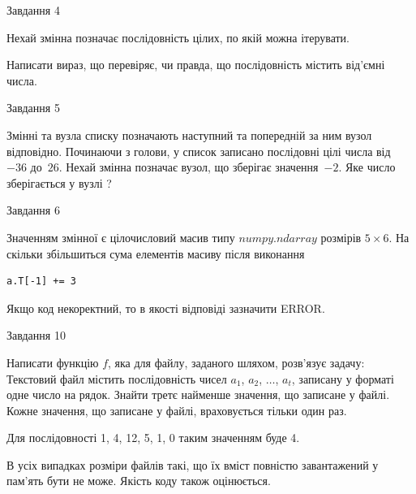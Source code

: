 \documentclass[12pt, ukrainian]{article}
\begin{document}
{               
{\begin{center}Завдання {4}\end{center}}
\vspace{-6mm}
Нехай змінна  позначає послідовність цілих, по якій можна ітерувати.

Написати вираз, що перевіряє, чи правда, що послідовність  містить від’ємні числа.\par

\vspace{10mm}
               
{\begin{center}Завдання {5}\end{center}}
\vspace{-6mm}
Змінні  та  вузла списку позначають наступний та попередній за ним вузол відповідно. Починаючи з голови, у список записано послідовні цілі числа від~$-36$ до~$26$. Нехай змінна  позначає вузол, що зберігає значення~$-2$.
Яке число зберігається у вузлі  ?\par

               
{\begin{center}Завдання {6}\end{center}}
\vspace{-6mm}
Значенням змінної  є цілочисловий масив типу $numpy.ndarray$ розмірів $5{\times}6$. На скільки збільшиться сума елементів масиву  після виконання
\begin{verbatim}
a.T[-1] += 3
\end{verbatim}


Якщо код некоректний, то в якості відповіді зазначити ERROR.\par

               
{\begin{center}Завдання {10}\end{center}}
\vspace{-6mm}

Написати функцію $f$, яка для файлу, заданого шляхом, розв’язує задачу:\\ Текстовий файл містить послідовність чисел $a_1$, $a_2$, $\ldots$, $a_t$, записану у форматі одне число на рядок. Знайти третє найменше значення, що записане у файлі. Кожне значення, що записане у файлі, враховується тільки один раз. \par
Для послідовності 1, 4, 12, 5, 1, 0 таким значенням буде 4.

В усіх випадках розміри файлів такі, що їх вміст повністю завантажений у пам'ять бути не може. Якість коду також оцінюється.



}
\end{document}
